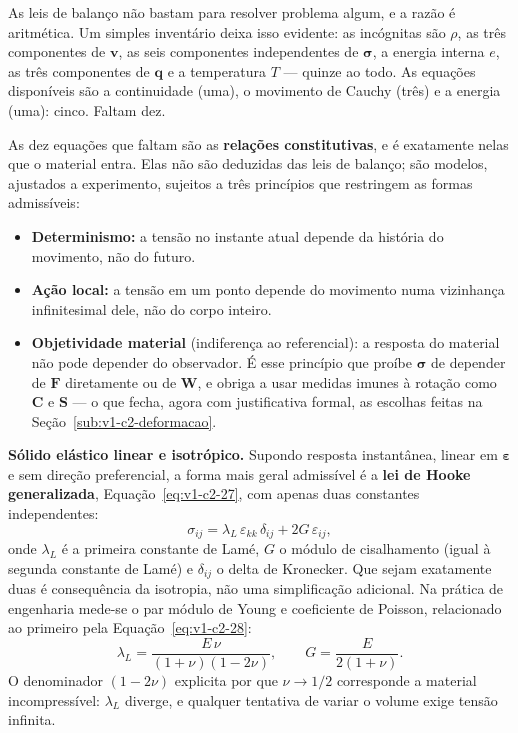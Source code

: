 \documentclass[12pt,a4paper]{article}
\numberwithin{equation}{section}
\numberwithin{table}{section}
\numberwithin{figure}{section}
\begin{document}
As leis de balanço não bastam para resolver problema algum, e a razão é
aritmética. Um simples inventário deixa isso evidente: as incógnitas são
$\rho$, as três componentes de $\mathbf{v}$, as seis componentes independentes
de $\boldsymbol{\sigma}$, a energia interna $e$, as três componentes de
$\mathbf{q}$ e a temperatura $T$ --- quinze ao todo. As equações disponíveis
são a continuidade (uma), o movimento de Cauchy (três) e a energia (uma):
cinco. Faltam dez.

As dez equações que faltam são as \textbf{relações constitutivas}, e é
exatamente nelas que o material entra. Elas não são deduzidas das leis de
balanço; são modelos, ajustados a experimento, sujeitos a três princípios que
restringem as formas admissíveis:

\begin{itemize}
	\item \textbf{Determinismo:} a tensão no instante atual depende da história
	do movimento, não do futuro.
	\item \textbf{Ação local:} a tensão em um ponto depende do movimento numa
	vizinhança infinitesimal dele, não do corpo inteiro.
	\item \textbf{Objetividade material} (indiferença ao referencial): a
	resposta do material não pode depender do observador. É esse princípio que
	proíbe $\boldsymbol{\sigma}$ de depender de $\mathbf{F}$ diretamente ou de
	$\mathbf{W}$, e obriga a usar medidas imunes à rotação como $\mathbf{C}$ e
	$\mathbf{S}$ --- o que fecha, agora com justificativa formal, as escolhas
	feitas na Seção~\ref{sub:v1-c2-deformacao}.
\end{itemize}

\textbf{Sólido elástico linear e isotrópico.} Supondo resposta instantânea,
linear em $\boldsymbol{\varepsilon}$ e sem direção preferencial, a forma mais
geral admissível é a \textbf{lei de Hooke generalizada},
Equação~\eqref{eq:v1-c2-27}, com apenas duas constantes independentes:
\begin{equation}\label{eq:v1-c2-27}
\sigma_{ij} = \lambda_L \, \varepsilon_{kk} \, \delta_{ij} +
2G \, \varepsilon_{ij},
\end{equation}
onde $\lambda_L$ é a primeira constante de Lamé, $G$ o módulo de cisalhamento
(igual à segunda constante de Lamé) e $\delta_{ij}$ o delta de Kronecker. Que
sejam exatamente duas é consequência da isotropia, não uma simplificação
adicional. Na prática de engenharia mede-se o par módulo de Young e coeficiente
de Poisson, relacionado ao primeiro pela Equação~\eqref{eq:v1-c2-28}:
\begin{equation}\label{eq:v1-c2-28}
\lambda_L = \frac{E\,\nu}{(1+\nu)(1-2\nu)},
\qquad
G = \frac{E}{2(1+\nu)} .
\end{equation}
O denominador $(1-2\nu)$ explicita por que $\nu \to 1/2$ corresponde a material
incompressível: $\lambda_L$ diverge, e qualquer tentativa de variar o volume
exige tensão infinita.
\end{document}
